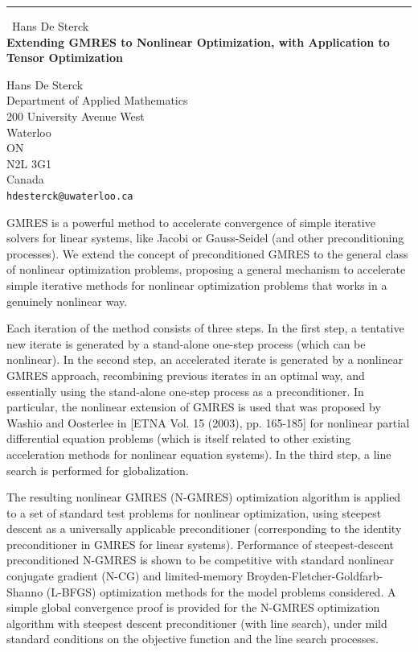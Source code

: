 \documentclass{report}
\begin{document}
\begin{center}
\rule{6in}{1pt} \
{\large Hans De Sterck \\
{\bf Extending GMRES to Nonlinear Optimization, with Application to Tensor Optimization}}

Hans De Sterck \\ Department of Applied Mathematics \\ 200 University Avenue West \\ Waterloo \\ ON \\ N2L 3G1 \\ Canada
\\
{\tt hdesterck@uwaterloo.ca}\end{center}

GMRES is a powerful method to accelerate convergence of simple iterative
solvers for linear systems, like Jacobi or Gauss-Seidel (and other
preconditioning processes). We extend the concept of preconditioned GMRES
to the general class of nonlinear optimization problems, proposing a
general mechanism to accelerate simple iterative methods for nonlinear
optimization problems that works in a genuinely nonlinear way.

Each iteration of the method consists of three steps. In the first step,
a tentative new iterate is generated by a stand-alone one-step process
(which can be nonlinear). In the second step, an accelerated iterate is
generated by a nonlinear GMRES approach, recombining previous iterates in
an optimal way, and essentially using the stand-alone one-step process as
a preconditioner. In particular, the nonlinear extension of GMRES is used
that was proposed by Washio and Oosterlee in [ETNA Vol. 15 (2003), pp.
165-185] for nonlinear partial differential equation problems (which is
itself related to other existing acceleration methods for nonlinear
equation systems). In the third step, a line search is performed for
globalization.

The resulting nonlinear GMRES (N-GMRES) optimization algorithm is applied
to a set of standard test problems for nonlinear optimization, using
steepest descent as a universally applicable preconditioner
(corresponding to the identity preconditioner in GMRES for linear
systems). Performance of steepest-descent preconditioned N-GMRES is shown
to be competitive with standard nonlinear conjugate gradient (N-CG) and
limited-memory Broyden-Fletcher-Goldfarb-Shanno (L-BFGS) optimization
methods for the model problems considered. A simple global convergence
proof is provided for the N-GMRES optimization algorithm with steepest
descent preconditioner (with line search), under mild standard conditions
on the objective function and the line search processes.
\end{document}
